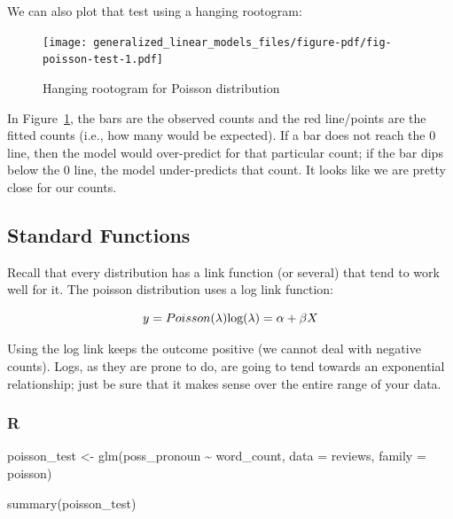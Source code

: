 \documentclass[
  letterpaper,
]{krantz}
\newenvironment{Shaded}{}{}
\newcommand{\AttributeTok}[1]{\textcolor[rgb]{0.49,0.56,0.16}{#1}}
\newcommand{\FunctionTok}[1]{\textcolor[rgb]{0.02,0.16,0.49}{#1}}
\newcommand{\NormalTok}[1]{#1}
\newcommand{\OtherTok}[1]{\textcolor[rgb]{0.00,0.44,0.13}{#1}}
\newcommand{\SpecialCharTok}[1]{\textcolor[rgb]{0.25,0.44,0.63}{#1}}
\begin{document}
We can also plot that test using a hanging rootogram:

\begin{figure}

{\centering \texttt{[image: generalized\_linear\_models\_files/figure-pdf/fig-poisson-test-1.pdf]}

}

\caption{\label{fig-poisson-test}Hanging rootogram for Poisson
distribution}

\end{figure}

In Figure~\ref{fig-poisson-test}, the bars are the observed counts and
the red line/points are the fitted counts (i.e., how many would be
expected). If a bar does not reach the 0 line, then the model would
over-predict for that particular count; if the bar dips below the 0
line, the model under-predicts that count. It looks like we are pretty
close for our counts.

\subsection{Standard Functions}\label{standard-functions-1}

Recall that every distribution has a link function (or several) that
tend to work well for it. The poisson distribution uses a log link
function:

\[y = Poisson(\lambda) \\ \text{log}(\lambda) = \alpha + \beta X\]

Using the log link keeps the outcome positive (we cannot deal with
negative counts). Logs, as they are prone to do, are going to tend
towards an exponential relationship; just be sure that it makes sense
over the entire range of your data.

\subsubsection{R}

\begin{Shaded}
\begin{Highlighting}[]
\NormalTok{poisson\_test }\OtherTok{\textless{}{-}} \FunctionTok{glm}\NormalTok{(poss\_pronoun }\SpecialCharTok{\textasciitilde{}}\NormalTok{ word\_count,}
                  \AttributeTok{data =}\NormalTok{ reviews,}
                  \AttributeTok{family =}\NormalTok{ poisson)}

\FunctionTok{summary}\NormalTok{(poisson\_test)}
\end{Highlighting}
\end{Shaded}
\end{document}
